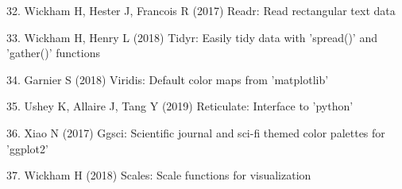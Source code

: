\documentclass[11pt,]{article}
\begin{document}
\leavevmode\hypertarget{ref-readr}{}%
32. Wickham H, Hester J, Francois R (2017) Readr: Read rectangular text
data

\leavevmode\hypertarget{ref-tidyr}{}%
33. Wickham H, Henry L (2018) Tidyr: Easily tidy data with 'spread()'
and 'gather()' functions

\leavevmode\hypertarget{ref-viridis}{}%
34. Garnier S (2018) Viridis: Default color maps from 'matplotlib'

\leavevmode\hypertarget{ref-reticulate}{}%
35. Ushey K, Allaire J, Tang Y (2019) Reticulate: Interface to 'python'

\leavevmode\hypertarget{ref-ggsci}{}%
36. Xiao N (2017) Ggsci: Scientific journal and sci-fi themed color
palettes for 'ggplot2'

\leavevmode\hypertarget{ref-scales}{}%
37. Wickham H (2018) Scales: Scale functions for visualization
\end{document}
